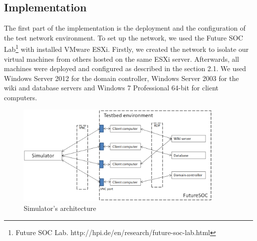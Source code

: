 \subsection{Implementation}
The first part of the implementation is the deployment and the configuration of the test network environment. To set up the network, we used the Future SOC Lab\footnote{Future SOC Lab. http://hpi.de/en/research/future-soc-lab.html} with installed VMware ESXi. Firstly, we created the network to isolate our virtual machines from others hosted on the same ESXi server. Afterwards, all machines were deployed and configured as described in the section 2.1. We used Windows Server 2012 for the domain controller, Windows Server 2003 for the wiki and database servers and Windows 7 Professional 64-bit for client computers. 

\begin{figure}[ht!]
\centering
\includegraphics[width=0.9\textwidth]{simulator_architecture.png}
\caption{Simulator's architecture}
\label{overflow}
\end{figure}


